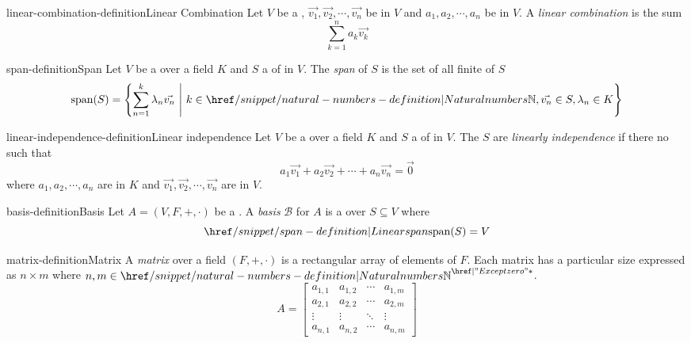 \documentclass[preview]{standalone}
\begin{document}
\begin{snippetdefinition}{linear-combination-definition}{Linear Combination}
    Let \(V\) be a \vectorspace,
    \(\vec{v_1}, \vec{v_2}, \cdots, \vec{v_n}\) be \vector[vectors] in \(V\) and
    \(a_1, a_2, \cdots, a_n\) be \vsscalar[scalars] in \(V\).
    A \textit{linear combination} is the sum
    \[
        \sum_{k=1}^n a_k\vec{v_k}
    \]
\end{snippetdefinition}

\begin{snippetdefinition}{span-definition}{Span}
    Let \(V\) be a \vectorspace over a field \(K\) and \(S\) a \set of \vector[vectors] in \(V\).
    The \textit{span} of \(S\) is the set of all finite 
    of \(S\)
    \[
        \text{span}(S) = \left\{
            \sum_{n=1}^k \lambda_n\vec{v_n} \ \middle|\
            k \in \naturalnumbers, \vec{v_n} \in S, \lambda_n \in K
        \right\}
    \]
\end{snippetdefinition}

\begin{snippetdefinition}{linear-independence-definition}{Linear independence}
    Let \(V\) be a \vectorspace over a field \(K\) and \(S\) a \set of \vector[vectors] in \(V\).
    The \vector[vectors] \(S\) are \textit{linearly independence} if there no
    \linearcombination such that
    \[ a_1\vec{v_1} + a_2\vec{v_2} + \cdots + a_n\vec{v_n} = \vec{0} \]
    where \(a_1, a_2, \cdots, a_n\) are \vsscalar[scalars] in \(K\) and \(\vec{v_1}, \vec{v_2}, \cdots, \vec{v_n}\)
    are \vector[vectors] in \(V\).
\end{snippetdefinition}

\begin{snippetdefinition}{basis-definition}{Basis}
    Let \(A=(V, F, +, \cdot)\) be a \vectorspace.
    A \textit{basis} \(\mathcal{B}\) for \(A\) is a \linearlyindependent
    \set over \vector[vectors] \(S\subseteq V\) where \[ \linearspan(S) = V \]
\end{snippetdefinition}

\begin{snippetdefinition}{matrix-definition}{Matrix}
    A \textit{matrix} over a field \((F, +, \cdot)\) is a rectangular array of elements of \(F\).
    Each matrix has a particular size expressed as \(n \times m\) where \(n,m\in {\naturalnumbers}^\exceptzero\).
    \[
    A = \begin{bmatrix} 
            a_{1,1} & a_{1,2} & \cdots & a_{1,m} \\
            a_{2,1} & a_{2,2} & \cdots & a_{2,m} \\
            \vdots  & \vdots  & \ddots & \vdots  \\
            a_{n,1} & a_{n,2} & \cdots & a_{n,m} 
        \end{bmatrix}
    \]
\end{snippetdefinition}
\end{document}
